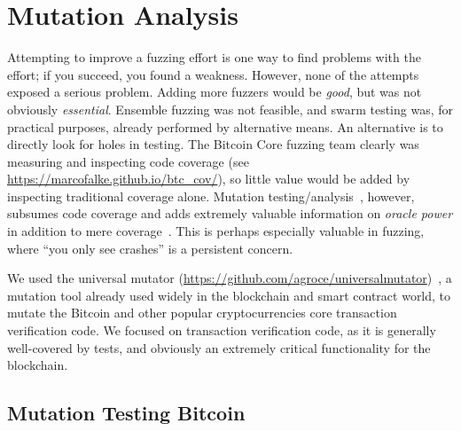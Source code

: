 \section{Mutation Analysis}

Attempting to improve a fuzzing effort is one way to find problems
with the effort; if you succeed, you found a weakness.  However, none
of the attempts exposed a serious problem.  Adding more fuzzers would
be \emph{good}, but was not obviously \emph{essential}.  Ensemble
fuzzing was not feasible, and swarm testing was, for practical
purposes, already performed by alternative means.  An alternative is
to directly look for holes in testing.  The Bitcoin Core fuzzing team
clearly was measuring and inspecting code coverage (see \url{https://marcofalke.github.io/btc_cov/}), so little value
would be added by inspecting traditional coverage alone.  Mutation
testing/analysis~\cite{MutationSurvey}, however, subsumes code coverage and adds extremely
valuable information on \emph{oracle power} in addition to mere
coverage~\cite{Discontents}.  This is perhaps especially valuable in fuzzing, where ``you
only see crashes'' is a persistent concern.

We used the universal mutator
\noindent(\url{https://github.com/agroce/universalmutator})~\cite{regexpMut}, a
mutation tool already used widely in the blockchain and smart contract world, to
mutate the Bitcoin and other popular cryptocurrencies core transaction
verification code. We focused on transaction verification code, as it is generally well-covered by
tests, and obviously an extremely critical functionality for the blockchain.

\subsection{Mutation Testing Bitcoin}

